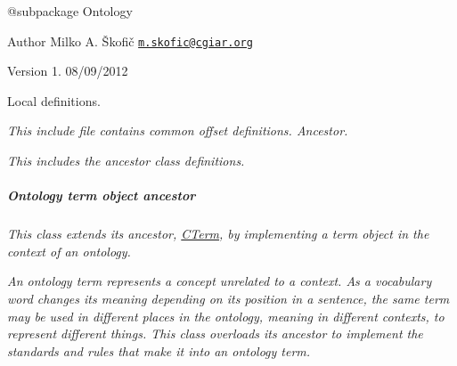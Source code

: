 {\itshape \begin{DoxyVerb} @subpackage        Ontology
\end{DoxyVerb}
}

{\itshape \begin{DoxyAuthor}{Author}
Milko A. Škofič \href{mailto:m.skofic@cgiar.org}{\tt m.\-skofic@cgiar.\-org} 
\end{DoxyAuthor}
\begin{DoxyVersion}{Version}
1. 08/09/2012
\end{DoxyVersion}
Local definitions.}

{\itshape This include file contains common offset definitions. Ancestor.}

{\itshape This includes the ancestor class definitions. \subparagraph*{Ontology term object ancestor}}

{\itshape }

{\itshape This class extends its ancestor, \hyperlink{class_c_term}{C\-Term}, by implementing a term object in the context of an ontology.}

{\itshape An ontology term represents a concept unrelated to a context. As a vocabulary word changes its meaning depending on its position in a sentence, the same term may be used in different places in the ontology, meaning in different contexts, to represent different things. This class overloads its ancestor to implement the standards and rules that make it into an ontology term.}

